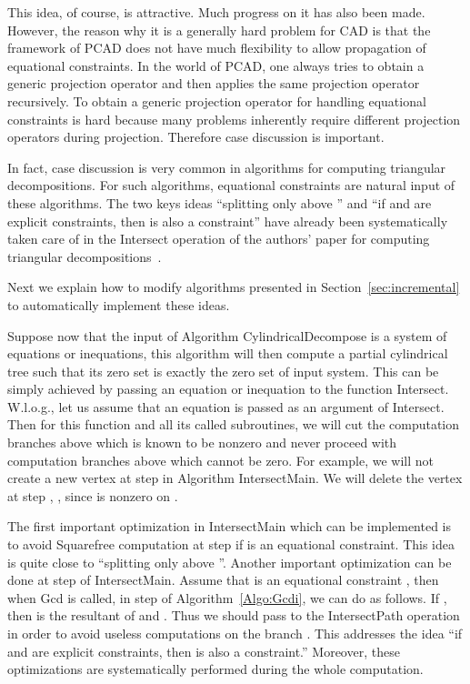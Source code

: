\documentclass[10pt]{article}
\newcommand{\CCAD}{{PCAD}}
\begin{document}
\begin{center}
This idea, of course, is attractive.
Much progress on it has also been made. 
However, the reason why it is a generally hard problem 
for CAD is that the framework of {\CCAD} does not have 
much flexibility to allow propagation of equational constraints. 
In the world of {\CCAD}, one always tries to obtain a generic 
projection operator and then applies the same projection operator 
recursively. To obtain a generic projection operator 
for handling equational constraints is hard
because many problems inherently require different projection operators
during projection. 
Therefore case discussion is important.

In fact, case discussion is very common in algorithms for computing 
triangular decompositions.
For such algorithms, equational constraints are natural input of these algorithms. 
The two keys ideas ``splitting only above '' and  ``if  and  are explicit constraints, 
then  is also a constraint'' have already been systematically 
taken care of in the {\sf Intersect} operation of the authors' paper
for  computing triangular decompositions~\cite{CM11}.

Next we explain how to modify algorithms presented in Section~\ref{sec:incremental} to 
automatically implement these ideas.

Suppose now that the input of Algorithm {\sf CylindricalDecompose} is a 
system of equations or inequations, 
this algorithm will then compute a partial cylindrical tree 
such that its zero set is exactly the zero set of input system.
This can be simply achieved by passing an equation or inequation 
to the function {\sf Intersect}.
W.l.o.g., let us assume that an equation  is passed as 
an argument of {\sf Intersect}.
Then for this function and all its called subroutines, 
we will cut the computation branches above which  is known to be nonzero 
and never proceed with computation branches above which  cannot be zero.
For example, we will not create a new vertex at step  
in Algorithm {\sf IntersectMain}.
We will delete the vertex  at step , ,  since  is nonzero on .

The first important optimization in {\sf IntersectMain} which can be implemented 
is to avoid {\sf Squarefree} computation at step  if 
is an equational constraint.
This idea is quite close to ``splitting only above ''.
Another important optimization can be done 
at step  of {\sf IntersectMain}. 
Assume that  is an equational constraint , 
then when {\sf Gcd} is called, 
in step  of Algorithm~\ref{Algo:Gcdi},
we can do as follows. 
If , then  is the resultant of  and .
Thus we should pass  to the {\sf IntersectPath} operation
in order to avoid useless computations 
on the branch .
This addresses the idea ``if  and  are explicit constraints, 
then  is also a constraint.''
Moreover, these optimizations are systematically performed during the whole 
computation.


\end{center}
\end{document}
